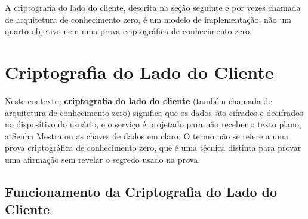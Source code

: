 \documentclass{article}
\begin{document}
A criptografia do lado do cliente, descrita na seção seguinte e por vezes chamada de arquitetura de conhecimento zero, é um modelo de implementação, não um quarto objetivo nem uma prova criptográfica de conhecimento zero.

\pagebreak

\section{Criptografia do Lado do Cliente}

Neste contexto, \textbf{criptografia do lado do cliente} (também chamada de arquitetura de conhecimento zero) significa que os dados são cifrados e decifrados no dispositivo do usuário, e o serviço é projetado para não receber o texto plano, a Senha Mestra ou as chaves de dados em claro. O termo não se refere a uma prova criptográfica de conhecimento zero, que é uma técnica distinta para provar uma afirmação sem revelar o segredo usado na prova.

\subsection{Funcionamento da Criptografia do Lado do Cliente}
\end{document}
